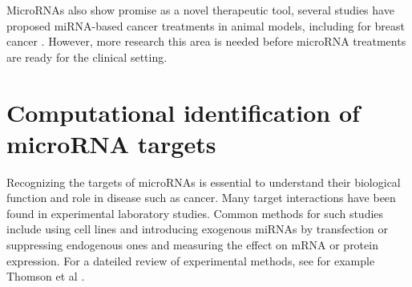 MicroRNAs also show promise as a novel therapeutic tool, several studies have
proposed miRNA-based cancer treatments in animal models, including for breast
cancer \citep{VanRooij2014}. However, more research this area is needed before
microRNA treatments are ready for the clinical setting.





















\section{Computational identification of microRNA targets}




Recognizing the targets of microRNAs is essential to understand their
biological function and role in disease such as cancer. Many target
interactions have been found in experimental laboratory studies. Common
methods for such studies include using cell lines and introducing exogenous
miRNAs by transfection or suppressing endogenous ones and measuring the
effect on mRNA or protein expression. For a dateiled review of experimental
methods, see for example Thomson et al \citep{Thomson2011}.


